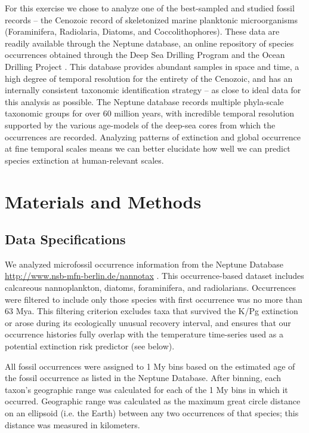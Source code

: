 \documentclass[12pt,letterpaper]{article}
\begin{document}
\begin{refsection}
For this exercise we chose to analyze one of the best-sampled and studied fossil records -- the Cenozoic record of skeletonized marine planktonic microorganisms (Foraminifera, Radiolaria, Diatoms, and Coccolithophores). These data are readily available through the Neptune database, an online repository of species occurrences obtained through the Deep Sea Drilling Program and the Ocean Drilling Project \citep{Lazarus1994,SpencerCervato1999}. This database provides abundant samples in space and time, a high degree of temporal resolution for the entirety of the Cenozoic, and has an internally consistent taxonomic identification strategy -- as close to ideal data for this analysis as possible. The Neptune database records multiple phyla-scale taxonomic groups for over 60 million years, with incredible temporal resolution supported by the various age-models of the deep-sea cores from which the occurrences are recorded. Analyzing patterns of extinction and global occurrence at fine temporal scales means we can better elucidate how well we can predict species extinction at human-relevant scales.



\section{Materials and Methods}

\subsection{Data Specifications}

We analyzed microfossil occurrence information from the Neptune Database \url{http://www.nsb-mfn-berlin.de/nannotax} \citep{Lazarus1994,SpencerCervato1999}. This occurrence-based dataset includes calcareous nannoplankton, diatoms, foraminifera, and radiolarians.%
Occurrences were filtered to include only those species with first occurrence was no more than 63 Mya. This filtering criterion excludes taxa that survived the K/Pg extinction or arose during its ecologically unusual recovery interval, and ensures that our occurrence histories fully overlap with the temperature time-series used as a potential extinction risk predictor (see below). 

All fossil occurrences were assigned to 1 My bins based on the estimated age of the fossil occurrence as listed in the Neptune Database. After binning, each taxon's geographic range was calculated for each of the 1 My bins in which it occurred. Geographic range was calculated as the maximum great circle distance on an ellipsoid (i.e. the Earth) between any two occurrences of that species; this distance was measured in kilometers. 


\end{refsection}
\end{document}
